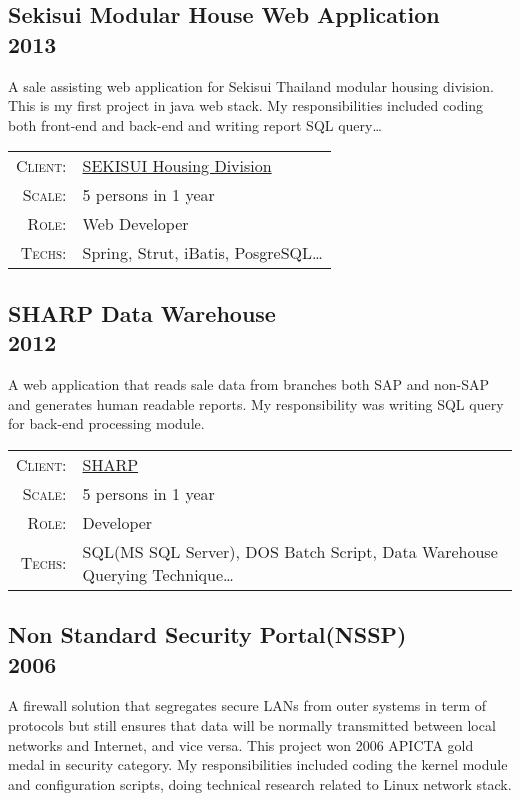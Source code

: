\documentclass[a4paper,10pt]{article}
\begin{document}
\subsection*{Sekisui Modular House Web Application\\\small 2013}

A sale assisting web application for Sekisui Thailand modular housing division.
This is my first project in java web stack.
My responsibilities included coding both front-end and back-end and writing report SQL query\ldots

\begin{tabular}{rl}
    \textsc{Client:} & \href{http://www.sekisuichemical.com/about/division/housing/}{SEKISUI Housing Division}\\
    \textsc{Scale:} & 5 persons in 1 year\\
    \textsc{Role:} & Web Developer\\
    \textsc{Techs:} & Spring, Strut, iBatis, PosgreSQL\ldots\\
\end{tabular}

\subsection*{SHARP Data Warehouse\\\small 2012}

A web application that reads sale data from branches both SAP and non-SAP and generates human readable reports.
My responsibility was writing SQL query for back-end processing module.

\begin{tabular}{rl}
    \textsc{Client:} & \href{http://www.sharp-world.com/}{SHARP}\\
    \textsc{Scale:} & 5 persons in 1 year\\
    \textsc{Role:} & Developer\\
    \textsc{Techs:} & SQL(MS SQL Server), DOS Batch Script, Data Warehouse Querying Technique\ldots\\
\end{tabular}

\subsection*{Non Standard Security Portal(NSSP)\\\small 2006}

A firewall solution that segregates secure LANs from outer systems in term of protocols but still ensures that data will be normally transmitted between local networks and Internet, and vice versa.
This project won 2006 APICTA gold medal in security category.
My responsibilities included coding the kernel module and configuration scripts, doing technical research related to Linux network stack.
\end{document}
